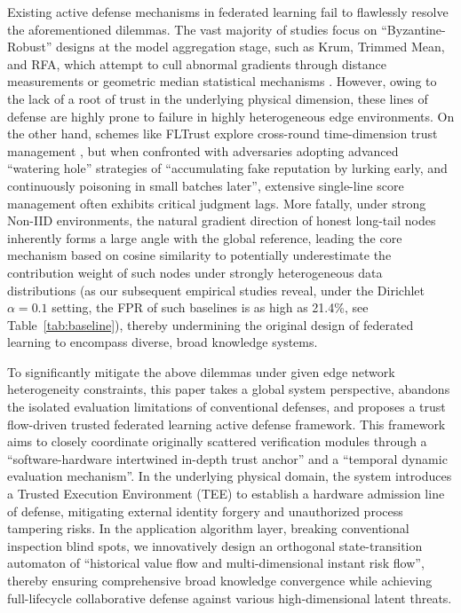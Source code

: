 \documentclass[runningheads]{llncs}
\begin{document}
Existing active defense mechanisms in federated learning fail to flawlessly resolve the aforementioned dilemmas. The vast majority of studies focus on ``Byzantine-Robust'' designs at the model aggregation stage, such as Krum, Trimmed Mean, and RFA, which attempt to cull abnormal gradients through distance measurements or geometric median statistical mechanisms \cite{blanchard2017krum,yin2018byzantine,pillutla2022robust}. However, owing to the lack of a root of trust in the underlying physical dimension, these lines of defense are highly prone to failure in highly heterogeneous edge environments. On the other hand, schemes like FLTrust explore cross-round time-dimension trust management \cite{cao2021fltrust,fung2020foolsgold}, but when confronted with adversaries adopting advanced ``watering hole'' strategies of ``accumulating fake reputation by lurking early, and continuously poisoning in small batches later'', extensive single-line score management often exhibits critical judgment lags. More fatally, under strong Non-IID environments, the natural gradient direction of honest long-tail nodes inherently forms a large angle with the global reference, leading the core mechanism based on cosine similarity to potentially underestimate the contribution weight of such nodes under strongly heterogeneous data distributions (as our subsequent empirical studies reveal, under the Dirichlet $\alpha=0.1$ setting, the FPR of such baselines is as high as 21.4\%, see Table~\ref{tab:baseline}), thereby undermining the original design of federated learning to encompass diverse, broad knowledge systems.

To significantly mitigate the above dilemmas under given edge network heterogeneity constraints, this paper takes a global system perspective, abandons the isolated evaluation limitations of conventional defenses, and proposes a trust flow-driven trusted federated learning active defense framework. This framework aims to closely coordinate originally scattered verification modules through a ``software-hardware intertwined in-depth trust anchor'' and a ``temporal dynamic evaluation mechanism''. In the underlying physical domain, the system introduces a Trusted Execution Environment (TEE) to establish a hardware admission line of defense, mitigating external identity forgery and unauthorized process tampering risks. In the application algorithm layer, breaking conventional inspection blind spots, we innovatively design an orthogonal state-transition automaton of ``historical value flow and multi-dimensional instant risk flow'', thereby ensuring comprehensive broad knowledge convergence while achieving full-lifecycle collaborative defense against various high-dimensional latent threats.
\end{document}

